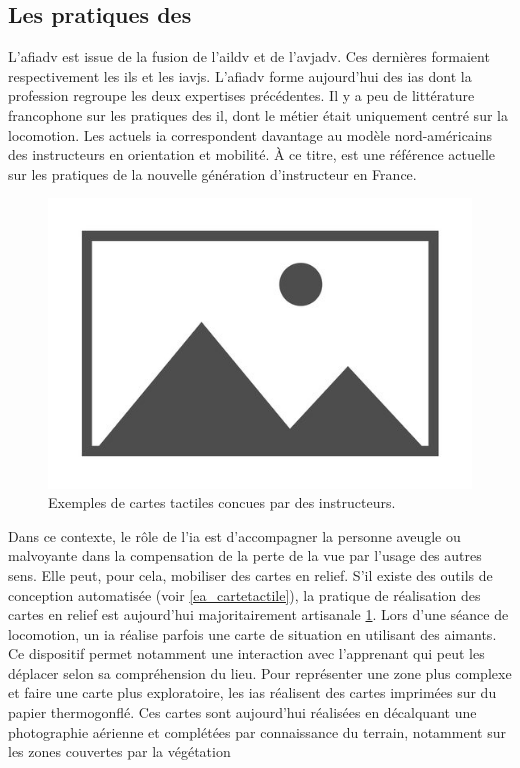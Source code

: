 \subsection{Les pratiques des \ipas{}}

\label{pratiques_ipas}

L'\gls{afiadv} est issue de la fusion de l'\gls{aildv} et de l'\gls{avjadv}. Ces dernières formaient respectivement les \glspl{il} et les \glspl{iavj}. L'\gls{afiadv} forme aujourd'hui des \glspl{ia} dont la profession regroupe les deux expertises précédentes. Il y a peu de littérature francophone sur les pratiques des \gls{il}, dont le métier était uniquement centré sur la locomotion. Les actuels \gls{ia} correspondent davantage au modèle nord-américains des instructeurs en orientation et mobilité. À ce titre, \cite{ratelle_manuel_2019} est une référence actuelle sur les pratiques de la nouvelle génération d'instructeur en France.

\begin{figure}
    \centering
    \includegraphics{images/placeholder.jpg}
    \caption{Exemples de cartes tactiles concues par des instructeurs.}
    \label{fig:il_carte}
\end{figure}

Dans ce contexte, le rôle de l'\gls{ia} est d'accompagner la personne aveugle ou malvoyante dans la compensation de la perte de la vue par l'usage des autres sens. Elle peut, pour cela, mobiliser des cartes en relief. S'il existe des outils de conception automatisée (voir \ref{ea_cartetactile}), la pratique de réalisation des cartes en relief est aujourd'hui majoritairement artisanale \ref{fig:il_carte}. Lors d'une séance de locomotion, un \gls{ia} réalise parfois une carte de situation en utilisant des aimants. Ce dispositif permet notamment une interaction avec l'apprenant qui peut les déplacer selon sa compréhension du lieu. Pour représenter une zone plus complexe et faire une carte plus exploratoire, les \glspl{ia} réalisent des cartes imprimées sur du papier thermogonflé. Ces cartes sont aujourd'hui réalisées en décalquant une photographie aérienne et complétées par connaissance du terrain, notamment sur les zones couvertes par la végétation

